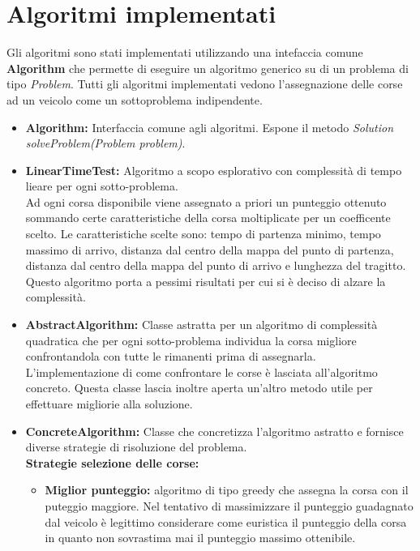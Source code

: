 \documentclass[11pt,a4paper]{article}
\begin{document}
\section{Algoritmi implementati}
Gli algoritmi sono stati implementati utilizzando una intefaccia comune \textbf{Algorithm} che permette di eseguire un algoritmo generico su di un problema di tipo \textit{Problem}.
Tutti gli algoritmi implementati vedono l'assegnazione delle corse ad un veicolo come un sottoproblema indipendente.
 
\begin{itemize}
	\item \textbf{Algorithm:} Interfaccia comune agli algoritmi. Espone il metodo \textit{Solution solveProblem(Problem problem)}.
	\item \textbf{LinearTimeTest:} Algoritmo a scopo esplorativo con complessità di tempo lieare per ogni sotto-problema. \\
	Ad ogni corsa disponibile viene assegnato a priori un punteggio ottenuto sommando certe caratteristiche della corsa moltiplicate per un coefficente scelto. Le caratteristiche scelte sono: tempo di partenza minimo, tempo massimo di arrivo, distanza dal centro della mappa del punto di partenza, distanza dal centro della mappa del punto di arrivo e lunghezza del tragitto. \\
	Questo algoritmo porta a pessimi risultati per cui si è deciso di alzare la complessità.
	\item \textbf{AbstractAlgorithm:} Classe astratta per un algoritmo di complessità quadratica che per ogni sotto-problema individua la corsa migliore confrontandola con tutte le rimanenti prima di assegnarla. \\
	L'implementazione di come confrontare le corse è lasciata all'algoritmo concreto. Questa classe lascia inoltre aperta un'altro metodo utile per effettuare migliorie alla soluzione.
	\item \textbf{ConcreteAlgorithm:} Classe che concretizza l'algoritmo astratto e fornisce diverse strategie di risoluzione del problema. \\
	\textbf{Strategie selezione delle corse:}
	\begin{itemize}
		\item \textbf{Miglior punteggio:} algoritmo di tipo greedy che assegna la corsa con il puteggio maggiore. Nel tentativo di massimizzare il punteggio guadagnato dal veicolo è legittimo considerare come euristica il punteggio della corsa in quanto non sovrastima mai il punteggio massimo ottenibile.

\end{itemize}
\end{itemize}
\end{document}
